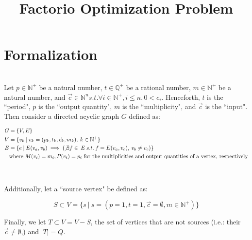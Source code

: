 \documentclass{article}
\title{Factorio Optimization Problem}
\begin{document}
\maketitle

\section{Formalization}
\\

\indent Let $p \in \mathbb{N}^+$ be a natural number, $t \in \mathbb{Q}^+$ be a rational number, $m \in \mathbb{N}^+$ be a natural number, and $\vec{c} \in \mathbb{N}^n s.t. \forall i \in \mathbb{N}^+, i \leq n,0 < c_i $. Henceforth, $t$ is the ``period", $p$ is the ``output quantity", $m$ is the ``multiplicity", and $\vec{c}$ is the ``input". Then consider a directed acyclic graph $G$ defined as:

\begin{align*}
G &=  \{V, E\}\\
 V &= \{v_k \: | \: v_k = (p_k, t_k, \vec{c}_k, m_k), \: k \in \mathbb{N}^+\}\\
 E &= \{e \: | \: E(v_a, v_b) \implies (\not \exists f \in \:E \: s.t.\: f = E(v_a, v_c), \: v_b \neq v_c)\}\\
 & \text{where } M(v_i) = m_i, P(v_i) = p_i \text{ for the multiplicities and output quantities of a vertex, respectively} \end{align*}

\\\medskip

Additionally, let a ``source vertex" be defined as:

\[
S \subset V = \{s \: | \: s = (p=1, t = 1, \vec{c} = \emptyset, m \in \mathbb{N}^+)\}
\]
\medskip

Finally, we let $T \subset V = V - S$, the set of vertices that are not sources (i.e.: their $\vec{c} \neq \emptyset$,) and $|T| = Q$. 
\end{document}
